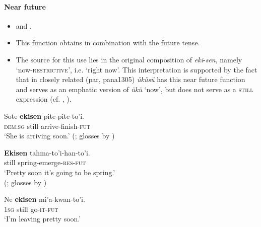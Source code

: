 \paragraph{Near future}
\label{appendixWesternShoshoniNearFuture}
\begin{itemize}
	\item \textcite[149]{CrumDayley1993} and \textcite[21]{McLaughlin2012}.
	\item This function obtains in combination with the future tense.
	\item The source for this use lies in the original composition of \mbox{\textit{eki}-\textit{sen}}, namely \lq now-\textsc{restrictive}', i.e. \lq right now'. This interpretation is supported by the fact that in closely related  (par, pana1305) \textit{üküsü} has this near future function and serves as an emphatic version of \textit{ükü} \lq now', but does not serve as a \textsc{still} expression (cf. \cite[369]{Dayley1989Dictionary}, \citeyear*[300]{Dayley1989Grammar}).
\end{itemize}

\begin{exe}
	\ex
	\gll Sote \textbf{ekisen} pite-pite-to'i.\\
	\textsc{dem}.\textsc{sg} still arrive-finish-\textsc{fut}\\
	\glt \lq She is arriving soon.\rq{ }(\cite[103]{CrumDayley1993}; glosses by \cite[52]{McLaughlin2012})

	\ex
	\gll \textbf{Ekisen} tahma-to'i-han-to'i.\\
	still spring-emerge-\textsc{res}-\textsc{fut}\\
	\glt \lq Pretty soon it’s going to be spring.'
	\\(\cite[150]{CrumDayley1993}; glosses by \cite[68]{McLaughlin2012})

	\ex
	\gll Ne \textbf{ekisen} mi’a-kwan-to’i.\\
	1\textsc{sg} still go-\textsc{it}-\textsc{fut}\\
	\glt \lq I’m leaving pretty soon.' \parencite[95]{CrumDayley1993}
\end{exe}
